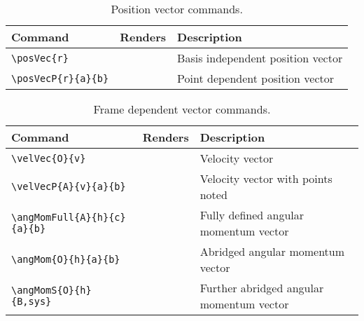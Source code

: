 \documentclass{article}
\begin{document}
	\begin{table}[h!]
		\caption{Position vector commands.}
		\begin{tabular}[]{ p{1.75in} | p{1.25in} | p{3in} }	
			\hline	
			\textbf{Command} & \textbf{Renders} & \textbf{Description} \\ 
			\hline
			\verb|\posVec{r}| & \posVec{r} & Basis independent position vector \\  
			\verb|\posVecP{r}{a}{b}| & \posVecP{r}{a}{b} & Point dependent position vector \\
			\hline		
		\end{tabular}
	\end{table}
	
	\begin{table}[h!]
		\caption{Frame dependent vector commands.}
		\begin{tabular}[]{ p{2in} | p{1.0in} | p{3in} }	
			\hline	
			\textbf{Command} & \textbf{Renders} & \textbf{Description} \\ 
			\hline
			\verb|\velVec{O}{v}| & \velVec{O}{v} & Velocity vector \\
			\verb|\velVecP{A}{v}{a}{b}| & \velVecP{A}{v}{a}{b} & Velocity vector with points noted \\
			\verb|\angMomFull{A}{h}{c}{a}{b}| & \angMomFull{A}{h}{c}{a}{b} & Fully defined angular momentum vector \\
			\verb|\angMom{O}{h}{a}{b}| & \angMom{O}{h}{a}{b} & Abridged angular momentum vector \\
			\verb|\angMomS{O}{h}{B,sys}| & \angMomS{O}{h}{B,sys} & Further abridged angular momentum vector \\
			\hline		
		\end{tabular}
	\end{table}
	
	
\end{document}
